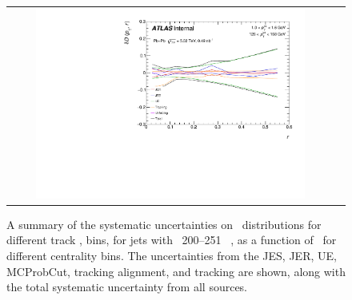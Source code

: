 \begin{figure}
{\begin{tabular}{cc}
	 \includegraphics[page=19, width=0.85\textwidth]{figures_systematics/ChPS_dR_sys_PbPb_error} \\
\end{tabular} }
   \caption{A summary of the systematic uncertainties on \RDptr\ distributions for different track \pt, bins, for jets with \pt\ 200--251  \GeV\ , as a function of \rvar\ for different centrality bins. The uncertainties from the JES, JER, UE, MCProbCut, tracking alignment, and tracking are shown, along with the total systematic uncertainty from all sources. }
      \label{fig:rdptr_sys_uncert_A2}
\end{figure}

